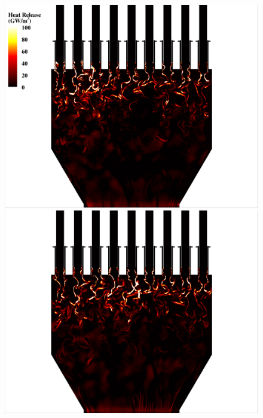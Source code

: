 \begin{figure}
	\begin{minipage}{0.49\linewidth}
		\includegraphics[width=0.99\linewidth,trim={0.5em 0em 6cm 0em},clip]{Chapters/HPROMResults/Images/nineElem/example_snaps/example_heat_z.png}
	\end{minipage}
	\begin{minipage}{0.49\linewidth}
		\includegraphics[width=0.99\linewidth,trim={6cm 0em 0.5em 0em},clip]{Chapters/HPROMResults/Images/nineElem/example_snaps/example_heat_z_217000.png}
	\end{minipage}


\end{figure}
